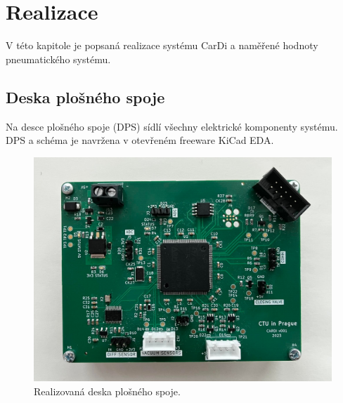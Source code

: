\chapter{Realizace}
V této kapitole je popsaná realizace systému CarDi a naměřené hodnoty pneumatického systému.

\section{Deska plošného spoje}
Na desce plošného spoje (DPS) sídlí všechny elektrické komponenty systému. DPS a schéma je navržena v otevřeném freeware KiCad EDA.
\begin{figure}[H]
    \includegraphics[width=1\linewidth]{pictures/pcb_full.jpg}
    \caption{Realizovaná deska plošného spoje.}
    \label{fig:pcb_full}
\end{figure}

